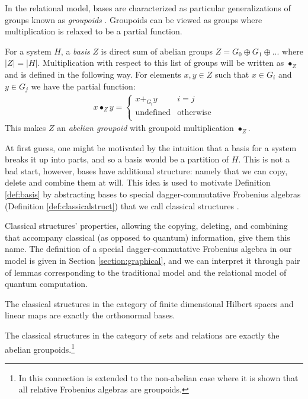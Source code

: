 In the relational model, bases are characterized as particular generalizations of groups known as \textit{groupoids} \cite{cqm-notes,pavlovic-2009}.  Groupoids can be viewed as groups where multiplication is relaxed to be a partial function.

\begin{defn}
\label{def:basis}
For a system $H$, a \emph{basis} $Z$ is direct sum of abelian groups $Z = G_0\oplus G_1\oplus...$ where $|Z| = |H|$.
Multiplication with respect to this list of groups will be written as $\bullet_Z$ and is defined in the following way. For elements $x,y\in Z$ such that $x\in G_i$ and $y\in G_j$ we have the partial function:
\begin{align}
\label{eq:groupoid_mult}
x\bullet_Zy = \begin{cases}
x +_{G_i} y & i=j \\
\mbox{undefined} & \mbox{otherwise}\\
\end{cases}
\end{align}
\noindent This makes $Z$ an \emph{abelian groupoid} with groupoid multiplication $\bullet_Z$.
\end{defn}

At first guess, one might be motivated by the intuition that a basis for a system breaks it up into parts, and so a basis would be a partition of $H$.  This is not a bad start, however, bases have additional structure: namely that we can copy, delete and combine them at will.  This idea is used to motivate Definition \ref{def:basis} by abstracting bases to special dagger-commutative Frobenius algebras (Definition \ref{def:classicalstruct}) that we call classical structures \cite{coecke-pavlovic-vicary-2008}.

Classical structures' properties, allowing the copying, deleting, and combining that accompany classical (as opposed to quantum) information, give them this name. The definition of a special dagger-commutative Frobenius algebra in our model is given in Section \ref{section:graphical}, and we can interpret it through pair of lemmas corresponding to the traditional model and the relational model of quantum computation.
\begin{lemma}
\label{lem:sdfa-hilb}
The classical structures in the category of finite dimensional Hilbert spaces and linear maps are exactly the orthonormal bases.
\end{lemma}

\begin{lemma}
\label{lem:sdfa-rel}
The classical structures in the category of sets and relations are exactly the abelian groupoids.\footnote{In \cite{heunen-relFrob} this connection is extended to the non-abelian case where it is shown that all relative Frobenius algebras are groupoids.}
\end{lemma}

